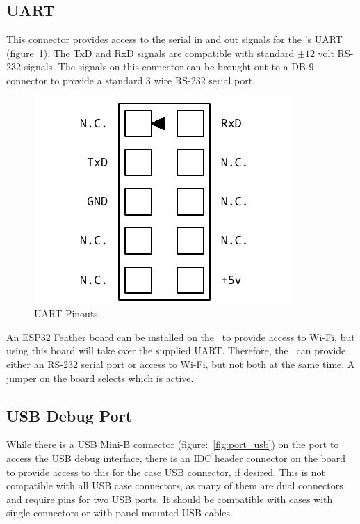\subsection*{UART}

This connector provides access to the serial in and out signals for the \jr's UART (figure~\ref{fig:port_uart}). The TxD and RxD signals are compatible with standard $\pm 12$ volt RS-232 signals. The signals on this connector can be brought out to a DB-9 connector to provide a standard 3 wire RS-232 serial port.

\begin{figure}[ht]
    \begin{center}
        \includegraphics[scale=0.65]{images/f256_port_uart.pdf}
    \end{center}
    \caption{UART Pinouts}
    \label{fig:port_uart}
\end{figure}

An ESP32 Feather board can be installed on the \jr\ to provide access to Wi-Fi, but using this board will take over the supplied UART. Therefore, the \jr\ can provide either an RS-232 serial port or access to Wi-Fi, but not both at the same time. A jumper on the board selects which is active.

\subsection*{USB Debug Port}

While there is a USB Mini-B connector (figure:~\ref{fig:port_usb}) on the port to access the USB debug interface, there is an IDC header connector on the board to provide access to this for the case USB connector, if desired. This is not compatible with all USB case connectors, as many of them are dual connectors and require pins for two USB ports. It should be compatible with cases with single connectors or with panel mounted USB cables.

